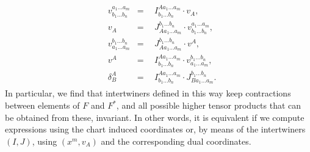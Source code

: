 \begin{align} \label{interRel}
    \begin{aligned}
    & v^{a_1 ... a_m}_{b_1 ... b_n} & = & \ \ I^{A a_1 ... a_m}_{b_1 ... b_n} \cdot v_{A},\\  
    & v_A & = & \ \ J^{b_1 ... b_n}_{A a_1 ... a_m} \cdot v^{a_1 ... a_m}_{b_1 ... b_n}, \\
    & v^{b_1 ... b_n}_{a_1 ... a_m} & = & \ \  J^{b_1 ... b_n}_{A a_1 ... a_m} \cdot v^A, \\ 
    & v^A & = & \ \  I^{A a_1 ... a_m}_{b_1 ... b_n} \cdot v^{b_1 ... b_n}_{a_1 ... a_m}, \\
    & \delta^A _ B & = & \ \   I^{A a_1 ... a_m}_{b_1 ... b_n} \cdot J^{b_1 ... b_n}_{B a_1 ... a_m}.  
    \end{aligned}
\end{align}
In particular, we find that intertwiners defined in this way keep contractions between elements of $F$ and $F^{\ast}$, and all possible higher tensor products that can be obtained from these, invariant. In other words, it is equivalent if we compute expressions using the chart induced coordinates or, by means of the intertwiners $(I,J)$, using $(x^m, v_A)$ and the corresponding dual coordinates.

